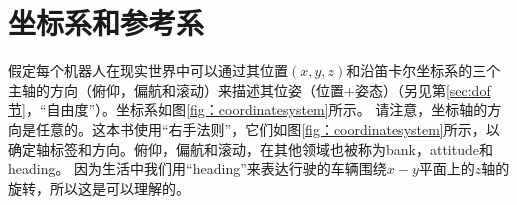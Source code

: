\section{坐标系和参考系}\label{sec:coordsystems}


假定每个机器人在现实世界中可以通过其位置$(x, y, z)$和沿笛卡尔坐标系的三个主轴的方向（俯仰，偏航和滚动）来描述其位姿（位置+姿态）（另见第\ref{sec:dof节}，“自由度”）。坐标系如图\ref{fig：coordinatesystem}所示。 请注意，坐标轴的方向是任意的。这本书使用“右手法则”，它们如图\ref {fig：coordinatesystem}所示，以确定轴标签和方向。俯仰，偏航和滚动，在其他领域也被称为bank，attitude和heading。   因为生活中我们用“heading”来表达行驶的车辆围绕$x-y$平面上的$z$轴的旋转，所以这是可以理解的。

